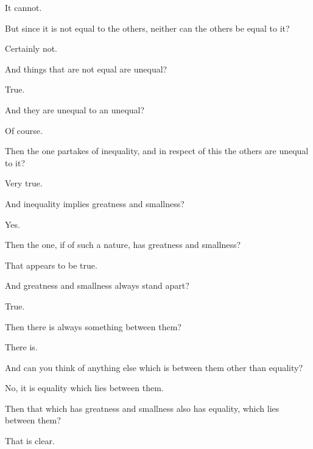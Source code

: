 \documentclass[11pt,letter]{article}
\begin{document}
\par  It cannot.

\par  But since it is not equal to the others, neither can the others be equal to it?

\par  Certainly not.

\par  And things that are not equal are unequal?

\par  True.

\par  And they are unequal to an unequal?

\par  Of course.

\par  Then the one partakes of inequality, and in respect of this the others are unequal to it?

\par  Very true.

\par  And inequality implies greatness and smallness?

\par  Yes.

\par  Then the one, if of such a nature, has greatness and smallness?

\par  That appears to be true.

\par  And greatness and smallness always stand apart?

\par  True.

\par  Then there is always something between them?

\par  There is.

\par  And can you think of anything else which is between them other than equality?

\par  No, it is equality which lies between them.

\par  Then that which has greatness and smallness also has equality, which lies between them?

\par  That is clear.
\end{document}
